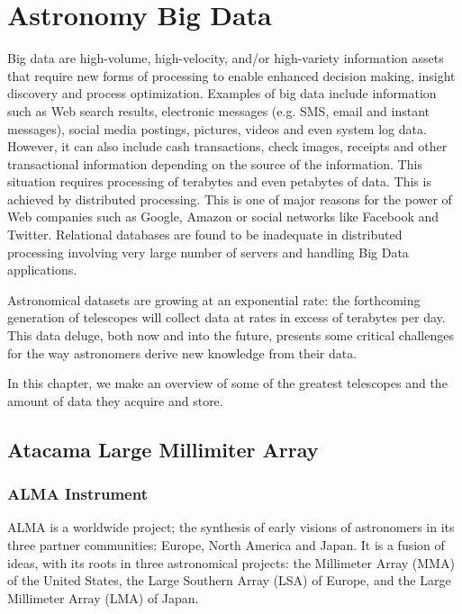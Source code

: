 \chapter{Astronomy Big Data}\label{theproblem}


Big data are high-volume, high-velocity, and/or high-variety information assets that require new forms of processing to enable enhanced decision making, insight discovery and process optimization. Examples of big data include information such as Web search results, electronic messages (e.g. SMS, email and instant messages), social media postings, pictures, videos and even system log data. However, it can also include cash transactions, check images, receipts and other transactional information depending on the source of the information. This situation requires processing of terabytes and even petabytes of data. This is achieved by distributed processing. This is one of major reasons for the power of Web companies such as
Google, Amazon or social networks like Facebook and Twitter. Relational databases are found to be inadequate in distributed processing involving very large number of servers and handling Big Data applications. \newline

Astronomical datasets are growing at an exponential rate: the forthcoming generation of telescopes will collect data at rates in excess of terabytes per day. This data deluge, both now and into the future, presents some critical challenges for the way astronomers derive new knowledge from their data. \newline

In this chapter, we make an overview of some of the greatest telescopes and the amount of data they acquire and store.


\section{Atacama Large Millimiter Array}

\subsection{ALMA Instrument}

ALMA is a worldwide project; the synthesis of early visions of astronomers in its three partner communities: Europe, North America and Japan. It is a fusion of ideas, with its roots in three astronomical projects: the Millimeter Array (MMA) of the United States, the Large Southern Array (LSA) of Europe, and the Large Millimeter Array (LMA) of Japan.

